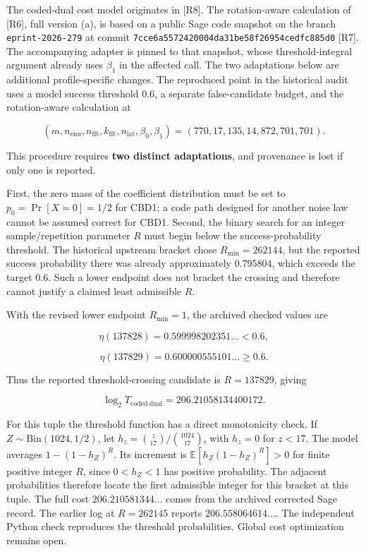 \documentclass[
  11pt,
  a4paper,
  oneside]{report}
\begin{document}
The coded-dual cost model originates in {[}R8{]}. The rotation-aware
calculation of {[}R6{]}, full version (a), is based on a public Sage
code snapshot on the branch \texttt{eprint-2026-279} at commit
\texttt{7cce6a5572420004da31be58f26954cedfc885d0} {[}R7{]}. The
accompanying adapter is pinned to that snapshot, whose
threshold-integral argument already uses \(\beta_1\) in the affected
call. The two adaptations below are additional profile-specific changes.
The reproduced point in the historical audit uses a model success
threshold \(0.6\), a separate false-candidate budget, and the
rotation-aware calculation at

\[
(m,n_{\mathrm{enu}},n_{\mathrm{fft}},k_{\mathrm{fft}},n_{\mathrm{lat}},\beta_0,\beta_1)
=(770,17,135,14,872,701,701).
\]

This procedure requires \textbf{two distinct adaptations}, and
provenance is lost if only one is reported.

First, the zero mass of the coefficient distribution must be set to
\(p_0=\Pr[X=0]=1/2\) for CBD1; a code path designed for another noise
law cannot be assumed correct for CBD1. Second, the binary search for an
integer sample/repetition parameter \(R\) must begin below the
success-probability threshold. The historical upstream bracket chose
\(R_{\min}=262144\), but the reported success probability there was
already approximately \(0.795804\), which exceeds the target \(0.6\).
Such a lower endpoint does not bracket the crossing and therefore cannot
justify a claimed least admissible \(R\).

With the revised lower endpoint \(R_{\min}=1\), the archived checked
values are

\[
\eta(137828)=0.599998202351\ldots<0.6,
\]

\[
\eta(137829)=0.600000555101\ldots\ge0.6.
\]

Thus the reported threshold-crossing candidate is \(R=137829\), giving

\[
\boxed{\log_2 T_{\mathrm{coded\ dual}}=206.21058134400172.}
\]

For this tuple the threshold function has a direct monotonicity check.
If \(Z\sim\mathrm{Bin}(1024,1/2)\), let
\(h_z=\binom z{17}/\binom{1024}{17}\), with \(h_z=0\) for \(z<17\). The
model averages \(1-(1-h_Z)^R\). Its increment is
\(\mathbb E[h_Z(1-h_Z)^R]>0\) for finite positive integer \(R\), since
\(0<h_Z<1\) has positive probability. The adjacent probabilities
therefore locate the first admissible integer for this bracket at this
tuple. The full cost \(206.210581344\ldots\) comes from the archived
corrected Sage record. The earlier log at \(R=262145\) reports
\(206.558064614\ldots\). The independent Python check reproduces the
threshold probabilities. Global cost optimization remains open.
\end{document}
